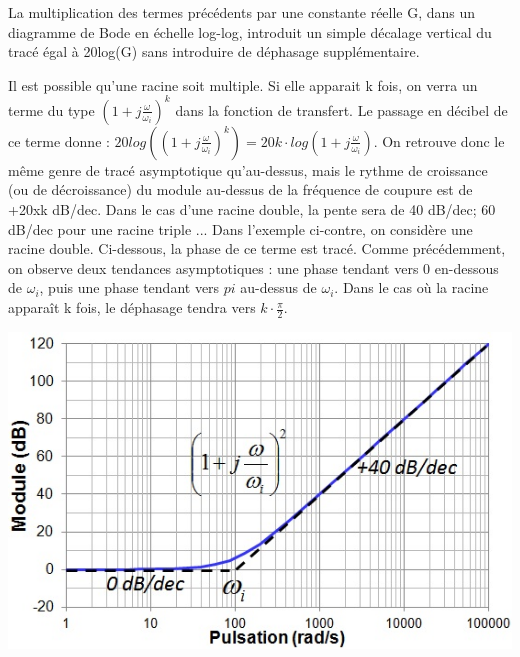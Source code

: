 	La multiplication des termes précédents par une constante réelle G, dans un diagramme de Bode en échelle log-log, introduit un simple décalage vertical du tracé égal à 20log(G) sans introduire de déphasage supplémentaire.
		
	\begin{minipage}[l]{0.5\linewidth}
		Il est possible qu'une racine soit multiple. Si elle apparait k fois, on verra un terme du type $(1+j\frac{\omega}{\omega_{i}})^{k}$ dans la fonction de transfert. Le passage en décibel de ce terme donne : $20log((1+j\frac{\omega}{\omega_{i}})^{k})=20k\cdot log(1+j\frac{\omega}{\omega_{i}})$. On retrouve donc le même genre de tracé asymptotique qu'au-dessus, mais le rythme de croissance (ou de décroissance) du module au-dessus de la fréquence de coupure est de +20xk dB/dec. Dans le cas d'une racine double, la pente sera de 40 dB/dec; 60 dB/dec pour une racine triple ... Dans l'exemple ci-contre, on considère une racine double. Ci-dessous, la phase de ce terme est tracé. Comme précédemment, on observe deux tendances asymptotiques : une phase tendant vers 0 en-dessous de $\omega_{i}$, puis une phase tendant vers $pi$ au-dessus de $\omega_{i}$. Dans le cas où la racine apparaît k fois, le déphasage tendra vers $k \cdot \frac{\pi}{2}$.	
	\end{minipage} \hfill
	\begin{minipage}[c]{0.50\linewidth}
		\includegraphics[scale=0.6]{images/Trace_asympt__1_plus_jw_carre.jpg}	
	\end{minipage}
	
	\vspace{1\baselineskip}
	
